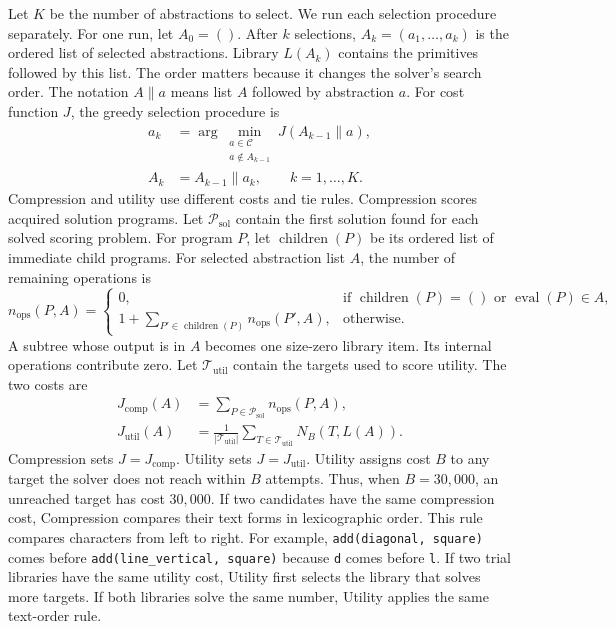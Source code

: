 \documentclass[10pt]{article}
\begin{document}
Let $K$ be the number of abstractions to select. We run each selection
procedure separately. For one run, let $A_0=()$. After $k$
selections, $A_k=(a_1,\ldots,a_k)$ is the ordered list of selected
abstractions. Library $L(A_k)$ contains the primitives followed by this list.
The order matters because it changes the solver's search order. The notation
$A\mathbin{\|}a$ means list $A$ followed by abstraction $a$. For cost function
$J$, the greedy selection procedure is
\begin{equation}
  \begin{aligned}
    a_k
      &=\arg\min_{\substack{a\in\mathcal C\\a\notin A_{k-1}}}
          J\!\left(A_{k-1}\mathbin{\|}a\right),\\
    A_k
      &=A_{k-1}\mathbin{\|}a_k,
        \qquad k=1,\ldots,K.
  \end{aligned}
\end{equation}
Compression and utility use different costs and tie rules. Compression scores
acquired solution programs. Let $\mathcal P_{\mathrm{sol}}$ contain the first
solution found for each solved scoring problem. For program $P$, let
$\operatorname{children}(P)$ be its ordered list of immediate child programs.
For selected abstraction list $A$, the number of remaining operations is
\begin{equation}
  n_{\mathrm{ops}}(P,A)
  =
  \begin{cases}
    0,
      & \text{if }\operatorname{children}(P)=()
        \text{ or }\operatorname{eval}(P)\in A,\\
    1+\displaystyle\sum_{P'\in\operatorname{children}(P)}
        n_{\mathrm{ops}}(P',A),
      & \text{otherwise}.
  \end{cases}
\end{equation}
A subtree whose output is in $A$ becomes one size-zero library item. Its
internal operations contribute zero. Let $\mathcal T_{\mathrm{util}}$ contain
the targets used to score utility. The two costs are
\begin{equation}
  \begin{aligned}
    J_{\mathrm{comp}}(A)
      &=\sum_{P\in\mathcal P_{\mathrm{sol}}}n_{\mathrm{ops}}(P,A),\\
    J_{\mathrm{util}}(A)
      &=\frac{1}{|\mathcal T_{\mathrm{util}}|}
        \sum_{T\in\mathcal T_{\mathrm{util}}}N_B\!\left(T,L(A)\right).
  \end{aligned}
\end{equation}
Compression sets $J=J_{\mathrm{comp}}$. Utility sets
$J=J_{\mathrm{util}}$. Utility assigns cost $B$ to any target the solver does
not reach within $B$ attempts. Thus, when $B=30{,}000$, an unreached target has
cost $30{,}000$. If two candidates have the same compression cost, Compression
compares their text forms in lexicographic order. This rule compares characters
from left to right. For example, \texttt{add(diagonal, square)} comes before
\texttt{add(line\_vertical, square)} because \texttt{d} comes before \texttt{l}.
If two trial libraries have the same utility cost, Utility first selects the
library that solves more targets. If both libraries solve the same number,
Utility applies the same text-order rule.
\end{document}
